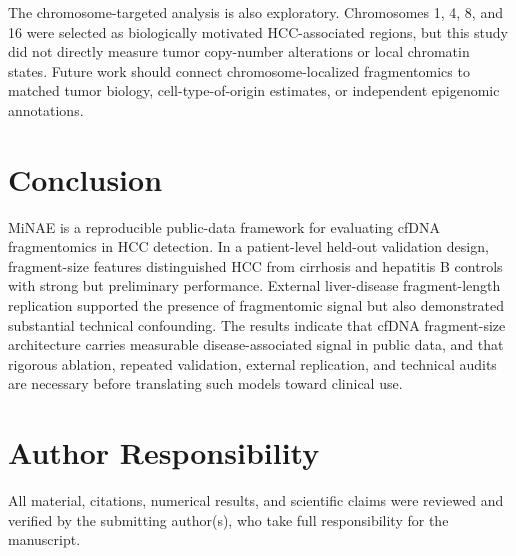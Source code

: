 \documentclass[conference]{IEEEtran}
\begin{document}
The chromosome-targeted analysis is also exploratory. Chromosomes 1, 4, 8, and 16 were selected as biologically motivated HCC-associated regions, but this study did not directly measure tumor copy-number alterations or local chromatin states. Future work should connect chromosome-localized fragmentomics to matched tumor biology, cell-type-of-origin estimates, or independent epigenomic annotations.

\section{Conclusion}
MiNAE is a reproducible public-data framework for evaluating cfDNA fragmentomics in HCC detection. In a patient-level held-out validation design, fragment-size features distinguished HCC from cirrhosis and hepatitis B controls with strong but preliminary performance. External liver-disease fragment-length replication supported the presence of fragmentomic signal but also demonstrated substantial technical confounding. The results indicate that cfDNA fragment-size architecture carries measurable disease-associated signal in public data, and that rigorous ablation, repeated validation, external replication, and technical audits are necessary before translating such models toward clinical use.

\section*{Author Responsibility}
All material, citations, numerical results, and scientific claims were reviewed and verified by the submitting author(s), who take full responsibility for the manuscript.



\end{document}
